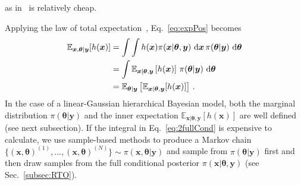 as in~\cite[Lemma 2]{fox2016fast} is relatively cheap.



Applying the law of total expectation~\cite{champ2022generalizedlawtotalcovariance}, Eq.~\eqref{eq:expPos} becomes
\begin{align}
	\mathbb{E}_{\bm{x} ,\bm{\theta}  |\bm{y}} [h(\bm{x})] &= \int \int   h(\bm{x}) \pi(\bm{x} |  \bm{\theta}, \bm{y}) \, \mathop{}\!\mathrm{d} \bm{x} \,  \pi(\bm{\theta} |   \bm{y}) \, \mathop{}\!\mathrm{d} \bm{\theta} \\
	&= \int \mathbb{E}_{\bm{x} |  \bm{\theta}, \bm{y}} \left[ h(\bm{x}) \right] \, \pi(\bm{\theta} |  \bm{y}) \, \mathop{}\!\mathrm{d} \bm{\theta}\label{eq:2fullCond} \\
		&= \mathbb{E}_{\bm{\theta} |  \bm{y}} \left[ \mathbb{E}_{\bm{x} |  \bm{\theta}, \bm{y}} [h(\bm{x})] \right] \, .
	\label{eq:fullCond}
\end{align}
In the case of a linear-Gaussian hierarchical Bayesian model, both the marginal distribution $\pi (\bm{\theta}| \bm{y})$ %
and the inner expectation $\mathbb{E}_{\bm{x} |  \bm{\theta}, \bm{y}} \left[ h(\bm{x}) \right]$ are well defined (see next subsection).
If the integral in Eq.~\ref{eq:2fullCond} is expensive to calculate, we use sample-based methods to produce a Markov chain $\{ (\bm{x}, \bm{\theta})^{(1)}, \dots, (\bm{x}, \bm{\theta})^{(N)} \} \sim \pi(\bm{x}, \bm{\theta} |  \bm{y}) $ and sample from $\pi(\bm{\theta} |  \bm{y})$ first and then draw samples from the full conditional posterior $\pi(\bm{x} | \bm{\theta} , \bm{y})$ (see Sec.~\ref{subsec:RTO}). 


